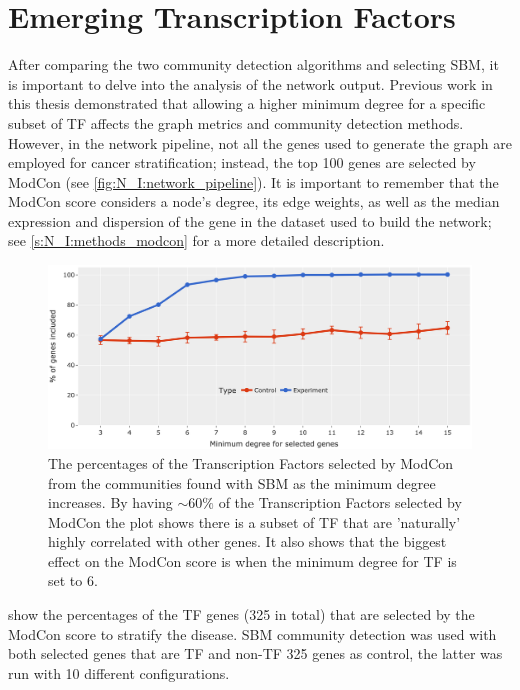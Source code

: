 
\section{Emerging Transcription Factors} \label{s:N_I:sel_tfs}

After comparing the two community detection algorithms and selecting SBM, it is important to delve into the analysis of the network output. Previous work in this thesis demonstrated that allowing a higher minimum degree for a specific subset of TF affects the graph metrics and community detection methods. However, in the network pipeline, not all the genes used to generate the graph are employed for cancer stratification; instead, the top 100 genes are selected by ModCon (see \cref{fig:N_I:network_pipeline}). It is important to remember that the ModCon score considers a node’s degree, its edge weights, as well as the median expression and dispersion of the gene in the dataset used to build the network; see \cref{s:N_I:methods_modcon} for a more detailed description.


\begin{figure}[!b]   
    \centering
    \includegraphics[width=1.0\textwidth,height=1.0\textheight,keepaspectratio]{Sections/Network_I/Resources/selective_pruning/com_comp/ctrls_min_dig_mev.png}
      \caption[Community detection performance in selective edge pruning]{The percentages of the Transcription Factors selected by ModCon from the communities found with \gls{SBM} as the minimum degree increases. By having $\sim60\%$ of the Transcription Factors selected by ModCon the plot shows there is a subset of TF that are 'naturally' highly correlated with other genes. It also shows that the biggest effect on the ModCon score is when the minimum degree for TF is set to 6.}
    \label{fig:N_I:sel_tfs}
\end{figure}

 show the percentages of the TF genes (325 in total) that are selected by the ModCon score to stratify the disease. SBM community detection was used with both selected genes that are TF and non-TF 325 genes as control, the latter was run with 10 different configurations.

